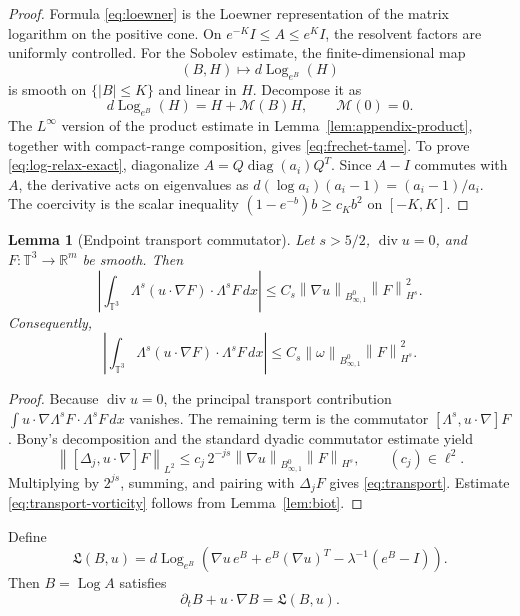 \documentclass[10pt,a4paper]{amsart}
\numberwithin{equation}{section}
\newtheorem{lemma}[theorem]{Lemma}
\newcommand{\T}{\mathbb T}
\newcommand{\R}{\mathbb R}
\newcommand{\Id}{I}
\newcommand{\divv}{\operatorname{div}}
\newcommand{\Log}{\operatorname{Log}}
\newcommand{\Besov}{B^0_{\infty,1}}
\newcommand{\norm}[1]{\left\lVert #1\right\rVert}
\begin{document}
\begin{proof}
Formula \eqref{eq:loewner} is the Loewner representation of the matrix
logarithm on the positive cone.  On \(e^{-K}\Id\le A\le e^K\Id\), the
resolvent factors are uniformly controlled.  For the Sobolev estimate, the
finite-dimensional map
\[
  (B,H)\mapsto d\Log_{e^B}(H)
\]
is smooth on \(\{|B|\le K\}\) and linear in \(H\).  Decompose it as
\[
  d\Log_{e^B}(H)=H+\mathcal M(B)H,\qquad \mathcal M(0)=0 .
\]
The \(L^\infty\) version of the product estimate in
Lemma~\ref{lem:appendix-product}, together with compact-range composition,
gives \eqref{eq:frechet-tame}.  To prove \eqref{eq:log-relax-exact},
diagonalize
\(A=Q\operatorname{diag}(a_i)Q^T\).  Since \(A-\Id\) commutes with \(A\), the
derivative acts on eigenvalues as \(d(\log a_i)(a_i-1)=(a_i-1)/a_i\).
The coercivity is the scalar inequality
\((1-e^{-b})b\ge c_K b^2\) on \([-K,K]\).
\end{proof}

\begin{lemma}[Endpoint transport commutator]
\label{lem:transport}
Let \(s>5/2\), \(\divv u=0\), and \(F:\T^3\to\R^m\) be smooth.  Then
\begin{equation}
  \left|
  \int_{\T^3}\Lambda^s(u\cdot\nabla F)\cdot\Lambda^sF\,dx
  \right|
  \le
  C_s\norm{\nabla u}_{B^0_{\infty,1}}\norm{F}_{H^s}^2 .
  \label{eq:transport}
\end{equation}
Consequently,
\begin{equation}
  \left|
  \int_{\T^3}\Lambda^s(u\cdot\nabla F)\cdot\Lambda^sF\,dx
  \right|
  \le
  C_s\norm{\omega}_{\Besov}\norm{F}_{H^s}^2 .
  \label{eq:transport-vorticity}
\end{equation}
\end{lemma}

\begin{proof}
Because \(\divv u=0\), the principal transport contribution
\(\int u\cdot\nabla\Lambda^sF\cdot\Lambda^sF\,dx\) vanishes.  The remaining
term is the commutator \([\Lambda^s,u\cdot\nabla]F\).  Bony's decomposition
and the standard dyadic commutator estimate yield
\[
  \norm{[\Delta_j,u\cdot\nabla]F}_{L^2}
  \le
  c_j\,2^{-js}
  \norm{\nabla u}_{B^0_{\infty,1}}\norm{F}_{H^s},
  \qquad (c_j)\in\ell^2 .
\]
Multiplying by \(2^{js}\), summing, and pairing with \(\Delta_jF\) gives
\eqref{eq:transport}.  Estimate \eqref{eq:transport-vorticity} follows from
Lemma~\ref{lem:biot}.
\end{proof}

Define
\[
  \mathfrak L(B,u)=
  d\Log_{e^B}\left(\nabla u\,e^B+e^B(\nabla u)^T-\lambda^{-1}(e^B-\Id)\right).
\]
Then \(B=\Log A\) satisfies
\[
  \partial_tB+u\cdot\nabla B=\mathfrak L(B,u).
\]
\end{document}
